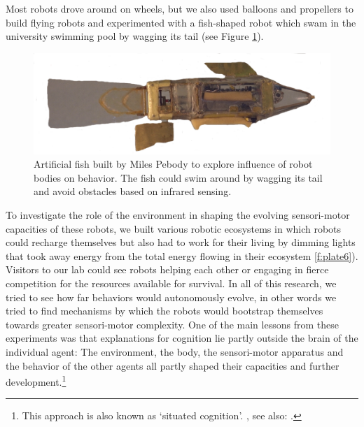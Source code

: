 Most robots drove around on wheels, but we also used balloons and propellers to build 
flying robots and experimented with a fish-shaped robot which swam in the university swimming pool by wagging 
its tail (see Figure \ref{f:plate4}). 

\begin{figure}[htbp]
  \centerline{\includegraphics[width=.85\textwidth]{chap1/figs/fish}}
\caption{\small Artificial fish built by Miles Pebody to explore influence of robot bodies on behavior. The fish could swim around by wagging 
its tail and avoid obstacles based on infrared sensing.}
\label{f:plate4}
\end{figure}

To investigate the role of the environment in shaping the
evolving sensori-motor capacities of these robots, 
we built various robotic 
ecosystems in which robots could recharge themselves but also
had to work for their living by 
dimming lights that took away energy from the total energy 
flowing in their ecosystem  \ref{f:plate6}). Visitors
to our lab could see robots helping each other or 
engaging in fierce competition for
the resources available for survival. In all of this
research, we tried to see how far behaviors would
autonomously evolve, in other words we tried to find 
mechanisms by which the robots would bootstrap themselves 
towards greater sensori-motor complexity. One of the 
main lessons from these experiments was that 
explanations for cognition lie partly outside the brain 
of the individual agent: The environment, the body, the 
sensori-motor apparatus and the behavior of the other 
agents all partly shaped their capacities and 
further development.\footnote{This approach is also known as `situated cognition'. 
\cite{Clancey:1997}, see also: \cite{Varela:1991}.}

